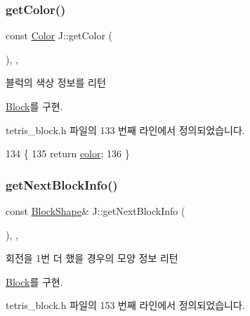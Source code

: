 \subsubsection{\texorpdfstring{get\+Color()}{getColor()}}
{\footnotesize\ttfamily const \mbox{\hyperlink{class_block_ad054b4ac51df79aa910040b2a2fdf7b5}{Color}} J\+::get\+Color (\begin{DoxyParamCaption}{ }\end{DoxyParamCaption})\hspace{0.3cm}{\ttfamily [inline]}, {\ttfamily [override]}, {\ttfamily [virtual]}}



블럭의 색상 정보를 리턴 



\mbox{\hyperlink{class_block_af10efef648f21dc708e42e149cd6fbcf}{Block}}를 구현.



tetris\+\_\+block.\+h 파일의 133 번째 라인에서 정의되었습니다.


\begin{DoxyCode}
134     \{
135         \textcolor{keywordflow}{return} \mbox{\hyperlink{class_j_adf3d9ba6faa25890b274cba9eabf02e5}{color}};
136     \}
\end{DoxyCode}
\mbox{\label{class_j_aeeaf9ab45ccf61d0e7435e3d1bf04300}} 
\subsubsection{\texorpdfstring{get\+Next\+Block\+Info()}{getNextBlockInfo()}}
{\footnotesize\ttfamily const \mbox{\hyperlink{class_block_aca5d951639f113e2ebd7856209d6b9ab}{Block\+Shape}}\& J\+::get\+Next\+Block\+Info (\begin{DoxyParamCaption}{ }\end{DoxyParamCaption})\hspace{0.3cm}{\ttfamily [inline]}, {\ttfamily [override]}, {\ttfamily [virtual]}}



회전을 1번 더 했을 경우의 모양 정보 리턴 



\mbox{\hyperlink{class_block_a654da164e0493be9de6f2f2334bc73e8}{Block}}를 구현.



tetris\+\_\+block.\+h 파일의 153 번째 라인에서 정의되었습니다.


